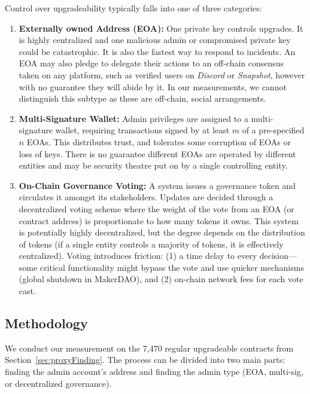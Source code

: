 Control over upgradeability typically falls into one of three categories: 

\begin{enumerate}
\item \textbf{Externally owned Address (EOA):}
One private key controls upgrades. It is highly centralized and one malicious admin or compromised private key could be catastrophic. It is also the fastest way to respond to incidents. An EOA may also pledge to delegate their actions to an off-chain consensus taken on any platform, such as verified users on \textit{Discord} or \textit{Snapshot}, however with no guarantee they will abide by it. In our measurements, we cannot distinguish this subtype as these are off-chain, social arrangements. 

\item \textbf{Multi-Signature Wallet:}
Admin privileges are assigned to a multi-signature wallet, requiring transactions signed by at least $m$ of a pre-specified $n$ EOAs.   This distributes trust, and tolerates some corruption of EOAs or loss of keys. There is no guarantee different EOAs are operated by different entities and may be security theatre put on by a single controlling entity.

\item \textbf{On-Chain Governance Voting:} A system issues a governance token and circulates it amongst its stakeholders. Updates are decided through a decentralized voting scheme where the weight of the vote from an EOA (or contract address) is proportionate to how many tokens it owns. This system is potentially highly decentralized, but the degree depends on the distribution of tokens (\eg if a single entity controls a majority of tokens, it is effectively centralized). Voting introduces friction: (1) a time delay to every decision---some critical functionality might bypass the vote and use quicker mechanisms (\eg global shutdown in MakerDAO), and (2) on-chain network fees for each vote cast.

\end{enumerate}

\subsection{Methodology}

We conduct our measurement on the 7,470 regular upgradeable contracts from Section~\ref{sec:proxyFinding}. The process can be divided into two main parts: finding the admin account's address and finding the admin type (EOA, multi-sig, or decentralized governance).

